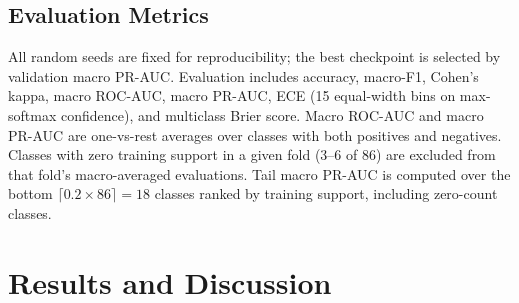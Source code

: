 \documentclass[11pt,a4paper,twocolumn]{article}
\begin{document}
\begin{table}[htbp]
\centering
\caption{XGBoost baseline hyperparameters.}
\label{tab:xgboost_hyperparams}
\end{table}

\subsection{Evaluation Metrics}
All random seeds are fixed for reproducibility; the best checkpoint is
selected by validation macro PR-AUC.
Evaluation includes accuracy, macro-F1, Cohen's kappa, macro ROC-AUC,
macro PR-AUC, ECE (15 equal-width bins on max-softmax confidence), and
multiclass Brier score.
Macro ROC-AUC and macro PR-AUC are one-vs-rest averages over classes with
both positives and negatives.
Classes with zero training support in a given fold (3--6 of 86) are excluded
from that fold's macro-averaged evaluations.
Tail macro PR-AUC is computed over the bottom
$\lceil 0.2 \times 86 \rceil = 18$ classes ranked by training support,
including zero-count classes.

\section{Results and Discussion}
\end{document}
